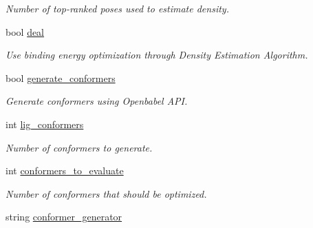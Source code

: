 \begin{DoxyCompactItemize}
\begin{DoxyCompactList}\small\item\em Number of top-\/ranked poses used to estimate density. \item\end{DoxyCompactList}\item 
\hypertarget{classPARSER_a316c28e50a7cf6073bcd29d7375514e8}{
bool \hyperlink{classPARSER_a316c28e50a7cf6073bcd29d7375514e8}{deal}}
\label{classPARSER_a316c28e50a7cf6073bcd29d7375514e8}

\begin{DoxyCompactList}\small\item\em Use binding energy optimization through Density Estimation Algorithm. \item\end{DoxyCompactList}\item 
\hypertarget{classPARSER_ae00c2a39b1eaf557ef4f2e7fdff8e0fe}{
bool \hyperlink{classPARSER_ae00c2a39b1eaf557ef4f2e7fdff8e0fe}{generate\_\-conformers}}
\label{classPARSER_ae00c2a39b1eaf557ef4f2e7fdff8e0fe}

\begin{DoxyCompactList}\small\item\em Generate conformers using Openbabel API. \item\end{DoxyCompactList}\item 
\hypertarget{classPARSER_a9e52c9af18d4401c72c5c95c3e8b6882}{
int \hyperlink{classPARSER_a9e52c9af18d4401c72c5c95c3e8b6882}{lig\_\-conformers}}
\label{classPARSER_a9e52c9af18d4401c72c5c95c3e8b6882}

\begin{DoxyCompactList}\small\item\em Number of conformers to generate. \item\end{DoxyCompactList}\item 
\hypertarget{classPARSER_adef96790659375a8c00f2775794dec98}{
int \hyperlink{classPARSER_adef96790659375a8c00f2775794dec98}{conformers\_\-to\_\-evaluate}}
\label{classPARSER_adef96790659375a8c00f2775794dec98}

\begin{DoxyCompactList}\small\item\em Number of conformers that should be optimized. \item\end{DoxyCompactList}\item 
\hypertarget{classPARSER_af1b41a06f39ed4f7f43ae236519c9c91}{
string \hyperlink{classPARSER_af1b41a06f39ed4f7f43ae236519c9c91}{conformer\_\-generator}}
\label{classPARSER_af1b41a06f39ed4f7f43ae236519c9c91}


\end{DoxyCompactItemize}
